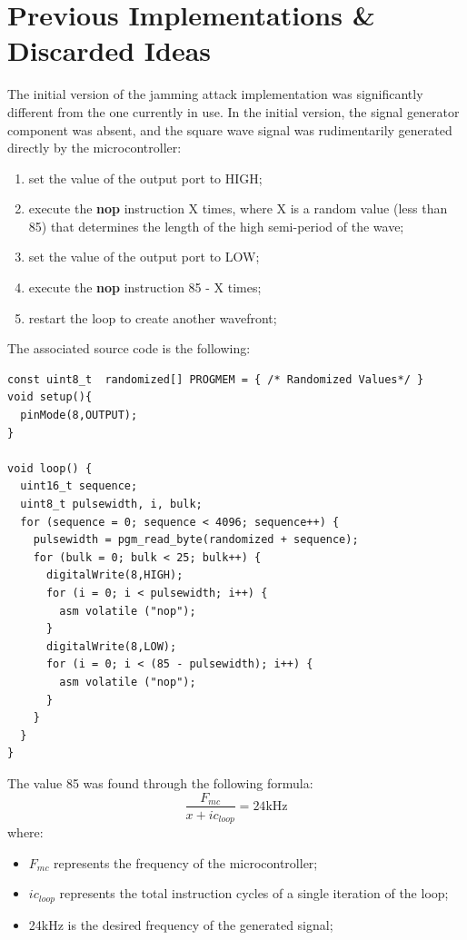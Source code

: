 \section{Previous Implementations \& Discarded Ideas}
The initial version of the jamming attack implementation was significantly different from the one currently in use.
In the initial version, the signal generator component was absent, and the square wave signal was rudimentarily generated directly by the microcontroller:
\begin{enumerate}
    \item set the value of the output port to HIGH;
    \item execute the \textbf{nop} instruction X times, where X is a random value (less than 85) that determines the length of the high semi-period of the wave;
    \item set the value of the output port to LOW;
    \item execute the \textbf{nop} instruction 85 - X times;
    \item restart the loop to create another wavefront;
\end{enumerate}
The associated source code is the following:
\begin{verbatim}
const uint8_t  randomized[] PROGMEM = { /* Randomized Values*/ }
void setup(){
  pinMode(8,OUTPUT);
}

void loop() {
  uint16_t sequence;
  uint8_t pulsewidth, i, bulk;
  for (sequence = 0; sequence < 4096; sequence++) {
    pulsewidth = pgm_read_byte(randomized + sequence);
    for (bulk = 0; bulk < 25; bulk++) {
      digitalWrite(8,HIGH);
      for (i = 0; i < pulsewidth; i++) {
        asm volatile ("nop");
      }
      digitalWrite(8,LOW);
      for (i = 0; i < (85 - pulsewidth); i++) {
        asm volatile ("nop");
      }
    }
  }
}

\end{verbatim}
The value 85 was found through the following formula:
\[\frac{F_{mc}} {x + ic_{loop}} = 24 \unit{\kilo\hertz}  \]
where:
\begin{itemize}
        \item $F_{mc}$ represents the frequency of the microcontroller;
        \item $ic_{loop}$ represents the total instruction cycles of a single iteration of the loop;
        \item 24\unit{\kilo\hertz} is the desired frequency of the generated signal;
\end{itemize}

